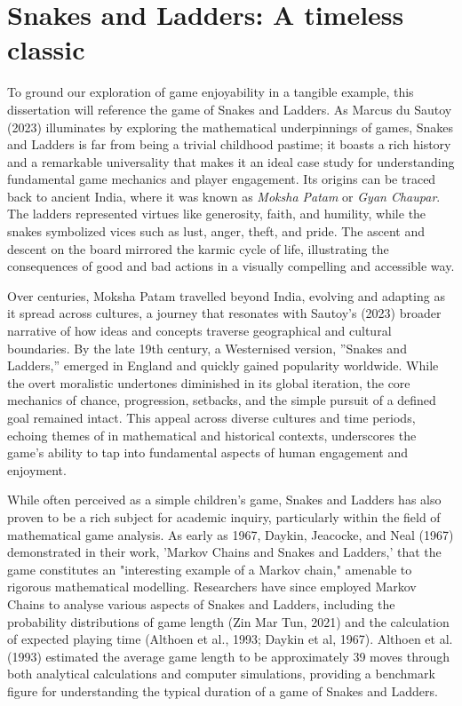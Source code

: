 \section{Snakes and Ladders: A timeless classic}
To ground our exploration of game enjoyability in a tangible example, this dissertation will reference the game of Snakes and Ladders.  As Marcus du Sautoy (2023) illuminates by exploring the mathematical underpinnings of games, Snakes and Ladders is far from being a trivial childhood pastime; it boasts a rich history and a remarkable universality that makes it an ideal case study for understanding fundamental game mechanics and player engagement. Its origins can be traced back to ancient India, where it was known as \textit{Moksha Patam} or \textit{Gyan Chaupar}. The ladders represented virtues like generosity, faith, and humility, while the snakes symbolized vices such as lust, anger, theft, and pride. The ascent and descent on the board mirrored the karmic cycle of life,
illustrating the consequences of good and bad actions in a visually compelling and accessible way.

Over centuries, Moksha Patam travelled beyond India, evolving and adapting as it spread across cultures, a journey that resonates with Sautoy’s (2023) broader narrative of how ideas and concepts traverse geographical and cultural boundaries. By the late 19th century, a Westernised version, ”Snakes and Ladders,” emerged in England and quickly gained popularity worldwide. While the overt moralistic undertones diminished in its global iteration, the core mechanics of chance, progression, setbacks, and the simple pursuit of a defined goal remained intact. This appeal across diverse cultures and time periods, echoing themes of in mathematical and historical contexts, underscores the game’s ability to tap into fundamental aspects of human engagement and enjoyment.

While often perceived as a simple children's game, Snakes and Ladders has also proven to be a rich subject for academic inquiry, particularly within the field of mathematical game analysis.  As early as 1967, Daykin, Jeacocke, and Neal (1967) demonstrated in their work, 'Markov Chains and Snakes and Ladders,' that the game constitutes an "interesting example of a Markov chain," amenable to rigorous mathematical modelling. Researchers have since employed Markov Chains to analyse various aspects of Snakes and Ladders, including the probability distributions of game length (Zin Mar Tun, 2021) and the calculation of expected playing time (Althoen et al., 1993; Daykin et al, 1967).  Althoen et al. (1993) estimated the average game length to be approximately 39 moves through both analytical calculations and computer simulations, providing a benchmark figure for understanding the typical duration of a game of Snakes and Ladders.

